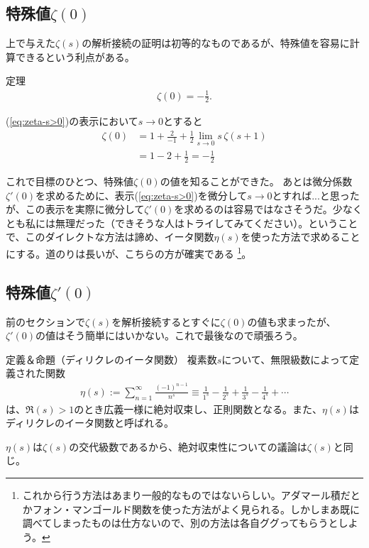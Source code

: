 \documentclass[11pt,b5paper,papersize,dvipdfmx]{jsbook}
\begin{document}
\clearpage

%
\subsection{特殊値$\zeta(0)$}
上で与えた$\zeta(s)$の解析接続の証明は初等的なものであるが、特殊値を容易に計算できるという利点がある。
\begin{thm}{定理}
  \begin{align}
    \zeta(0) = -\frac12.
  \end{align}
\end{thm}
\begin{prf}
  (\ref{eq:zeta-s>0})の表示において$s\to 0$とすると
  \begin{align*}
    \zeta(0) &= 1 + \frac{2}{-1} + \frac12 \lim_{s\to 0} s\,\zeta(s+1)\\
    &= 1 - 2 + \frac12 = -\frac12
  \end{align*}
\end{prf}

これで目標のひとつ、特殊値$\zeta(0)$の値を知ることができた。
あとは微分係数$\zeta'(0)$を求めるために、表示(\ref{eq:zeta-s>0})を微分して$s\to 0$とすれば...と思ったが、この表示を実際に微分して$\zeta'(0)$を求めるのは容易ではなさそうだ。少なくとも私には無理だった（できそうな人はトライしてみてください）。ということで、このダイレクトな方法は諦め、イータ関数$\eta(s)$を使った方法で求めることにする。道のりは長いが、こちらの方が確実である
\footnote{これから行う方法はあまり一般的なものではないらしい。アダマール積だとかフォン・マンゴールド関数を使った方法がよく見られる。しかしまあ既に調べてしまったものは仕方ないので、別の方法は各自ググってもらうとしよう。}。



\subsection{特殊値$\zeta'(0)$}
\label{sec:zeta'(0)}

前のセクションで$\zeta(s)$を解析接続するとすぐに$\zeta(0)$の値も求まったが、$\zeta'(0)$の値はそう簡単にはいかない。これで最後なので頑張ろう。

\begin{thm}{定義＆命題（ディリクレのイータ関数）}
  複素数$s$について、無限級数によって定義された関数
  \begin{align}
    \eta(s) := \sum_{n=1}^\infty \frac{(-1)^{n-1}}{n^s}
    \equiv \frac{1}{1^s} - \frac{1}{2^s} + \frac{1}{3^s} - \frac{1}{4^s} + \cdots
  \end{align}
  は、$\Re(s)>1$のとき広義一様に絶対収束し、正則関数となる。また、$\eta(s)$はディリクレのイータ関数と呼ばれる。
\end{thm}
\begin{prf}
  $\eta(s)$は$\zeta(s)$の交代級数であるから、絶対収束性についての議論は$\zeta(s)$と同じ。
\end{prf}
\end{document}
